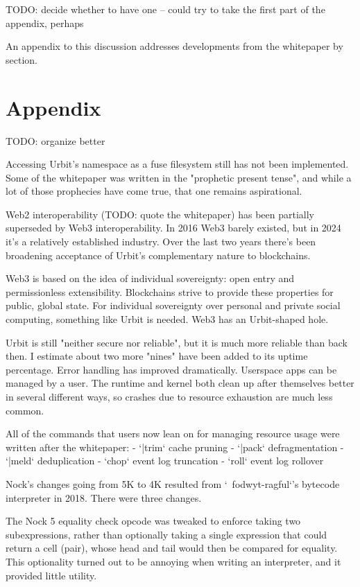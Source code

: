 \documentclass[twoside]{article}
\begin{document}
TODO: decide whether to have one – could try to take the first part of the appendix, perhaps

An appendix to this discussion addresses developments from the whitepaper by section.

\tombstone{}


\section{Appendix}

TODO: organize better

Accessing Urbit's namespace as a {\sc fuse} filesystem still has not been implemented.  Some of the whitepaper was written in the "prophetic present tense", and while a lot of those prophecies have come true, that one remains aspirational.

Web2 interoperability (TODO: quote the whitepaper) has been partially superseded by Web3 interoperability.  In 2016 Web3 barely existed, but in 2024 it's a relatively established industry.  Over the last two years there's been broadening acceptance of Urbit's complementary nature to blockchains. 

Web3 is based on the idea of individual sovereignty: open entry and permissionless extensibility.  Blockchains strive to provide these properties for public, global state.  For individual sovereignty over personal and private social computing, something like Urbit is needed.  Web3 has an Urbit-shaped hole.

Urbit is still "neither secure nor reliable", but it is much more reliable than back then.  I estimate about two more "nines" have been added to its uptime percentage.  Error handling has improved dramatically.  Userspace apps can be managed by a user.  The runtime and kernel both clean up after themselves better in several different ways, so crashes due to resource exhaustion are much less common.

All of the commands that users now lean on for managing resource usage were written after the whitepaper:
- `|trim` cache pruning
- `|pack` defragmentation
- `|meld` deduplication
- `chop` event log truncation
- `roll` event log rollover

Nock's changes going from 5K to 4K resulted from `~fodwyt-ragful`'s bytecode interpreter in 2018.  There were three changes.

The Nock 5 equality check opcode was tweaked to enforce taking two subexpressions, rather than optionally taking a single expression that could return a cell (pair), whose head and tail would then be compared for equality.  This optionality turned out to be annoying when writing an interpreter, and it provided little utility.
\end{document}
